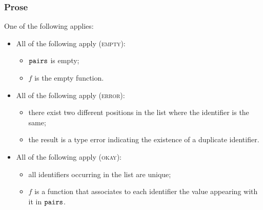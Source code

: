 \subsubsection{Prose}
One of the following applies:
\begin{itemize}
  \item All of the following apply (\textsc{empty}):
  \begin{itemize}
    \item $\texttt{pairs}$ is empty;
    \item $f$ is the empty function.
  \end{itemize}

  \item All of the following apply (\textsc{error}):
  \begin{itemize}
    \item there exist two different positions in the list where the identifier is the same;
    \item the result is a type error indicating the existence of a duplicate identifier.
  \end{itemize}

  \item All of the following apply (\textsc{okay}):
  \begin{itemize}
    \item all identifiers occurring in the list are unique;
    \item $f$ is a function that associates to each identifier the value appearing with it in $\texttt{pairs}$.
  \end{itemize}
\end{itemize}


\hypertarget{def-checknoduplicates}{}
